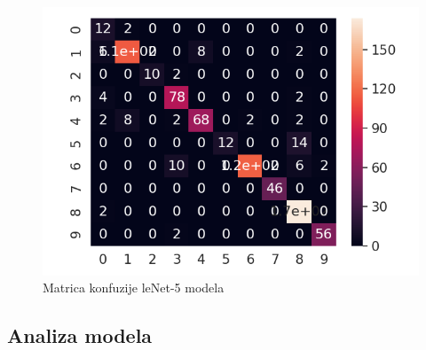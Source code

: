 \documentclass[a4paper]{article}
\begin{document}
\begin{figure}[h!]
\begin{center}
\includegraphics[scale=0.6]{confussion_matrix_1.png}
\end{center}
\caption{Matrica konfuzije leNet-5 modela}
\label{fig:confussion_matrix_1}
\end{figure}



\subsection{Analiza modela}
\label{sec:analiza_modela}
\end{document}
